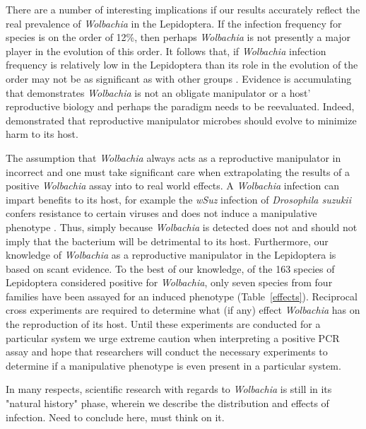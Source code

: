 \documentclass{frontiersSCNS}
\begin{document}
There are a number of interesting implications if our results accurately reflect the real prevalence of \emph{Wolbachia} in the Lepidoptera. If the infection frequency for species is on the order of 12\%, then perhaps \emph{Wolbachia} is not presently a major player in the evolution of this order.  It follows that, if \emph{Wolbachia} infection frequency is relatively low in the Lepidoptera than its role in the evolution of the order may not be as significant as with other groups \citep{Miller:2010ki}. Evidence is accumulating that demonstrates \emph{Wolbachia} is not an obligate manipulator or a host' reproductive biology \citep{Hamm:2014cv,Zhang:2010jl,Zhang:2013eo} and perhaps the paradigm needs to be reevaluated. Indeed, \citet{Prout:1994th} demonstrated that reproductive manipulator microbes should evolve to minimize harm to its host. 

The assumption that \emph{Wolbachia} always acts as a reproductive manipulator in incorrect \citep{Nice:2009p7399,Hamm:2014wi} and one must take significant care when extrapolating the results of a positive \emph{Wolbachia} assay into to real world effects. A \emph{Wolbachia} infection can impart benefits to its host, for example the \emph{wSuz} infection of \emph{Drosophila suzukii} confers resistance to certain viruses \citep{Cattel:IMB12245} and does not induce a manipulative phenotype \citep{Hamm:2014cv}. Thus, simply because \emph{Wolbachia} is detected does not and should not imply that the bacterium will be detrimental to its host. Furthermore, our knowledge of \emph{Wolbachia} as a reproductive manipulator in the Lepidoptera is based on scant evidence. To the best of our knowledge, of the 163 species of Lepidoptera considered positive for \emph{Wolbachia}, only seven species from four families have been assayed for an induced phenotype (Table~\ref{effects}). Reciprocal cross experiments are required to determine what (if any) effect \emph{Wolbachia} has on the reproduction of its host. Until these experiments are conducted for a particular system we urge extreme caution when interpreting a positive PCR assay and hope that researchers will conduct the necessary experiments to determine if a manipulative phenotype is even present in a particular system. 


In many respects, scientific research with regards to \textit{Wolbachia} is still in its "natural history" phase, wherein we describe the distribution and effects of infection.  
Need to conclude here, must think on it. 
\end{document}
